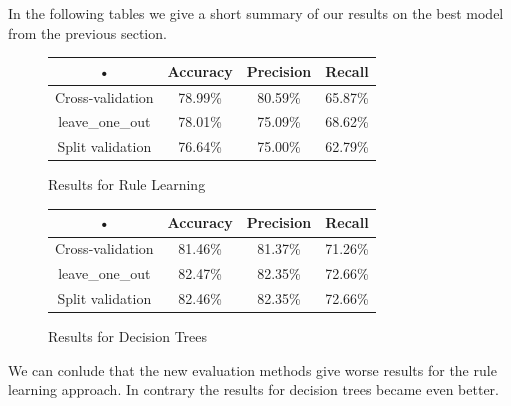 \documentclass[11pt,a4paper]{article}
\begin{document}
In the following tables we give a short summary of our results on the best model from the previous section.

\begin{figure}[H]
\centering
\begin{tabular}{c|c|c|c}

• & Accuracy & Precision & Recall \\ 
\hline 
Cross-validation & 78.99\% & 80.59\% & 65.87\% \\ 
\hline 
leave\_one\_out & 78.01\% & 75.09\% & 68.62\% \\ 
\hline 
Split validation & 76.64\% & 75.00\% & 62.79\% \\ 

\end{tabular} 
\caption{Results for Rule Learning}
\end{figure}

\begin{figure}[H]
\centering
\begin{tabular}{c|c|c|c}

• & Accuracy & Precision & Recall \\ 
\hline 
Cross-validation & 81.46\% & 81.37\% & 71.26\% \\ 
\hline 
leave\_one\_out & 82.47\% &82.35\% & 72.66\% \\ 
\hline 
Split validation & 82.46\% & 82.35\% & 72.66\% \\ 

\end{tabular} 
\caption{Results for Decision Trees}
\end{figure}

We can conlude that the new evaluation methods give worse results for the rule learning approach. In contrary the results for decision trees became even better. 
\end{document}
